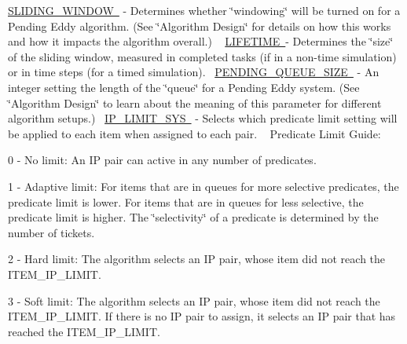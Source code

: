\mbox{\hyperlink{namespacedynamicfilterapp_1_1toggles_adf3c8ab64e62d33397a389d7ba49fe69}{S\+L\+I\+D\+I\+N\+G\+\_\+\+W\+I\+N\+D\+OW }} -\/ Determines whether \char`\"{}windowing\char`\"{} will be turned on for a Pending Eddy algorithm. (See \char`\"{}\+Algorithm Design\char`\"{} for details on how this works and how it impacts the algorithm overall.) ~\newline
 \mbox{\hyperlink{namespacedynamicfilterapp_1_1toggles_a06966aed6fa634825f18ad256f386496}{L\+I\+F\+E\+T\+I\+ME }}-\/ Determines the \char`\"{}size\char`\"{} of the sliding window, measured in completed tasks (if in a non-\/time simulation) or in time steps (for a timed simulation).~\newline
\mbox{\hyperlink{namespacedynamicfilterapp_1_1toggles_a642cb0e1f266db761b270ea65af5425a}{P\+E\+N\+D\+I\+N\+G\+\_\+\+Q\+U\+E\+U\+E\+\_\+\+S\+I\+ZE }} -\/ An integer setting the length of the \char`\"{}queue\char`\"{} for a Pending Eddy system. (See \char`\"{}\+Algorithm Design\char`\"{} to learn about the meaning of this parameter for different algorithm setups.)~\newline
 \mbox{\hyperlink{namespacedynamicfilterapp_1_1toggles_ab27926159525360b29661a4778b0ce7c}{I\+P\+\_\+\+L\+I\+M\+I\+T\+\_\+\+S\+YS }} -\/ Selects which predicate limit setting will be applied to each item when assigned to each pair. ~\newline
Predicate Limit Guide\+:
\begin{DoxyItemize}
\item 0 -\/ No limit\+: An IP pair can active in any number of predicates.
\item 1 -\/ Adaptive limit\+: For items that are in queues for more selective predicates, the predicate limit is lower. For items that are in queues for less selective, the predicate limit is higher. The \char`\"{}selectivity\char`\"{} of a predicate is determined by the number of tickets.
\item 2 -\/ Hard limit\+: The algorithm selects an IP pair, whose item did not reach the I\+T\+E\+M\+\_\+\+I\+P\+\_\+\+L\+I\+M\+IT.
\item 3 -\/ Soft limit\+: The algorithm selects an IP pair, whose item did not reach the I\+T\+E\+M\+\_\+\+I\+P\+\_\+\+L\+I\+M\+IT. If there is no IP pair to assign, it selects an IP pair that has reached the I\+T\+E\+M\+\_\+\+I\+P\+\_\+\+L\+I\+M\+IT.
\end{DoxyItemize}


